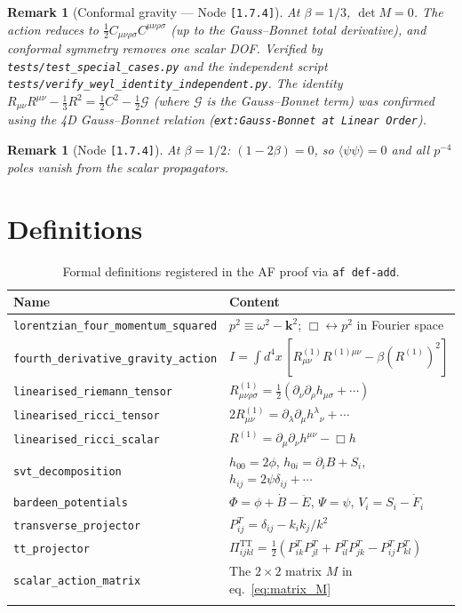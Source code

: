 \documentclass[11pt,a4paper]{article}
\newtheorem{remark}[theorem]{Remark}
\newcommand{\p}{\partial}
\newcommand{\dbox}{\Box}
\newcommand{\TT}{\mathrm{TT}}
\newcommand{\afnode}[1]{\texttt{[#1]}}
\newcommand{\aftest}[1]{\texttt{tests/#1}}
\newcommand{\afext}[1]{\texttt{ext:#1}}
\begin{document}
\begin{remark}[Conformal gravity --- Node \afnode{1.7.4}]
At $\beta = 1/3$, $\det M = 0$. The action reduces to
$\tfrac{1}{2}C_{\mu\nu\rho\sigma}C^{\mu\nu\rho\sigma}$ (up to the Gauss--Bonnet
total derivative), and conformal symmetry removes one scalar DOF.
Verified by \aftest{test\_special\_cases.py} and the independent script
\aftest{verify\_weyl\_identity\_independent.py}. The identity
$R_{\mu\nu}R^{\mu\nu} - \tfrac{1}{3}R^2 = \tfrac{1}{2}C^2 - \tfrac{1}{2}\mathcal{G}$
(where $\mathcal{G}$ is the Gauss--Bonnet term) was confirmed using the 4D
Gauss--Bonnet relation (\afext{Gauss-Bonnet at Linear Order}).
\end{remark}

\begin{remark}[Node \afnode{1.7.4}]
At $\beta = 1/2$: $(1-2\beta) = 0$, so $\langle\psi\psi\rangle = 0$
and all $p^{-4}$ poles vanish from the scalar propagators.
\end{remark}

\section{Definitions}
\label{sec:defs}

\begin{longtable}{lp{10cm}}
\toprule
\textbf{Name} & \textbf{Content} \\
\midrule
\endhead
\texttt{lorentzian\_four\_momentum\_squared} &
$p^2 \equiv \omega^2 - \mathbf{k}^2$; $\dbox \leftrightarrow p^2$ in Fourier space \\
\texttt{fourth\_derivative\_gravity\_action} &
$I = \int d^4x\,[R^{(1)}_{\mu\nu}R^{(1)\mu\nu} - \beta(R^{(1)})^2]$ \\
\texttt{linearised\_riemann\_tensor} &
$R^{(1)}_{\mu\nu\rho\sigma} = \tfrac{1}{2}(\p_\nu\p_\rho h_{\mu\sigma} + \cdots)$ \\
\texttt{linearised\_ricci\_tensor} &
$2R^{(1)}_{\mu\nu} = \p_\lambda\p_\mu h^\lambda{}_\nu + \cdots$ \\
\texttt{linearised\_ricci\_scalar} &
$R^{(1)} = \p_\mu\p_\nu h^{\mu\nu} - \dbox h$ \\
\texttt{svt\_decomposition} &
$h_{00} = 2\phi$, $h_{0i} = \p_i B + S_i$, $h_{ij} = 2\psi\delta_{ij} + \cdots$ \\
\texttt{bardeen\_potentials} &
$\Phi = \phi + \dot{B} - \ddot{E}$, $\Psi = \psi$, $V_i = S_i - \dot{F}_i$ \\
\texttt{transverse\_projector} &
$P^T_{ij} = \delta_{ij} - k_ik_j/k^2$ \\
\texttt{tt\_projector} &
$\Pi^{\TT}_{ijkl} = \tfrac{1}{2}(P^T_{ik}P^T_{jl} + P^T_{il}P^T_{jk} - P^T_{ij}P^T_{kl})$ \\
\texttt{scalar\_action\_matrix} &
The $2\times 2$ matrix $M$ in eq.~\eqref{eq:matrix_M} \\
\bottomrule
\caption{Formal definitions registered in the AF proof via \texttt{af def-add}.}
\label{tab:defs}
\end{longtable}
\end{document}
